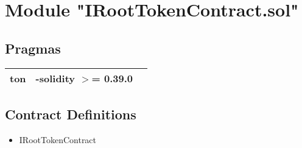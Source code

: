 
\section{Module "IRootTokenContract.sol"}


\subsection{Pragmas}


\noindent\begin{tabular}{|l|l|p{5cm}|}\hline
ton & -solidity $>$= 0.39.0 &\\\hline
\end{tabular}


\subsection{Contract Definitions}

\begin{itemize}
\item IRootTokenContract
\end{itemize}
